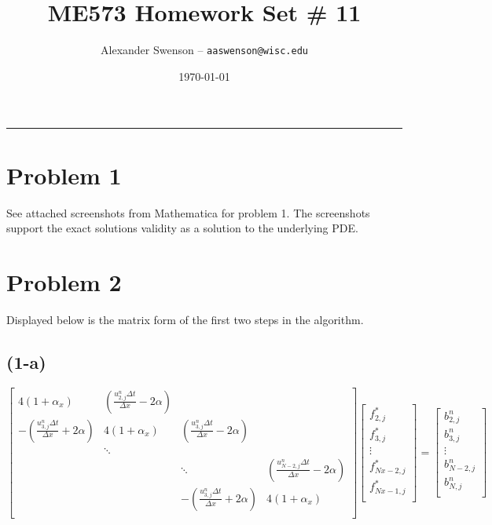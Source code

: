 \documentclass[12pt]{article}
\title{ME573 Homework Set \# 11}
\author{Alexander Swenson -- \texttt{aaswenson@wisc.edu}}
\date{\today}
\begin{document}
	
	\maketitle
	
	\vspace{-0.3in}
	\noindent
	\rule{\linewidth}{0.4pt}
	
	\noindent
	

\section{Problem 1}
	See attached screenshots from Mathematica for problem 1. The screenshots support the exact solutions validity as a solution to the underlying PDE.

\section{Problem 2}
	
\noindent Displayed below is the matrix form of the first two steps in the algorithm.
\subsection{(1-a)}	
\[
\begin{bmatrix} 
4(1+\alpha_x) & (\frac{u_{2,j}^n\Delta t}{\Delta x} - 2\alpha)   &			   &\\
-(\frac{u_{3,j}^n\Delta t}{\Delta x} + 2\alpha) & 4(1+\alpha_x) & (\frac{u_{3,j}^n\Delta t}{\Delta x} - 2\alpha)  &\\
& \ddots &			   &\\
&	 	  & \ddots & (\frac{u_{N-2,j}^n\Delta t}{\Delta x} - 2\alpha)  \\
&		  & -(\frac{u_{3,j}^n\Delta t}{\Delta x} + 2\alpha) & 4(1+\alpha_x)  \\ 
\end{bmatrix}
\begin{bmatrix} 
f_{2,j}^{*}\\
f_{3,j}^{*}\\
\vdots\\
f_{Nx-2,j}^{*}\\
f_{Nx-1,j}^{*}\\ 
\end{bmatrix} = 
\begin{bmatrix} 
b_{2,j}^n\\
b_{3,j}^n\\
\vdots\\
b_{N-2,j}^n\\
b_{N,j}^n\\ 
\end{bmatrix}
\]
\end{document}
